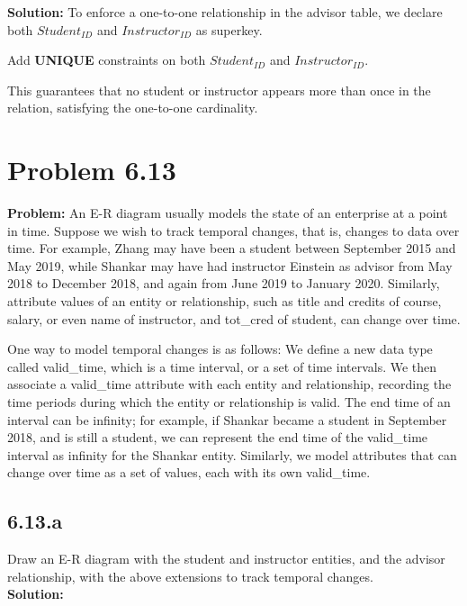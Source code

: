\documentclass[12pt,a4paper]{article}
\begin{document}
\textbf{Solution:} To enforce a one-to-one relationship in the advisor table, we declare both $Student_{ID}$ and $Instructor_{ID}$ as superkey.

Add \textbf{UNIQUE} constraints on both $Student_{ID}$ and $Instructor_{ID}$.

This guarantees that no student or instructor appears more than once in the relation, satisfying the one-to-one cardinality.

\section*{Problem 6.13}

\textbf{Problem:} An E-R diagram usually models the state of an enterprise at a point in time. Suppose we wish to track temporal changes, that is, changes to data over time. For example, Zhang may have been a student between September 2015 and May 2019, while Shankar may have had instructor Einstein as advisor from May 2018 to December 2018, and again from June 2019 to January 2020. Similarly, attribute values of an entity or relationship, such as title and credits of course, salary, or even name of instructor, and tot\_cred of student, can change over time.

One way to model temporal changes is as follows: We define a new data type called valid\_time, which is a time interval, or a set of time intervals. We then associate a valid\_time attribute with each entity and relationship, recording the time periods during which the entity or relationship is valid. The end time of an interval can be infinity; for example, if Shankar became a student in September 2018, and is still a student, we can represent the end time of the valid\_time interval as infinity for the Shankar entity. Similarly, we model attributes that can change over time as a set of values, each with its own valid\_time.

\subsection*{6.13.a}Draw an E-R diagram with the student and instructor entities, and the advisor relationship, with the above extensions to track temporal changes.\\

\textbf{Solution:}
\end{document}

